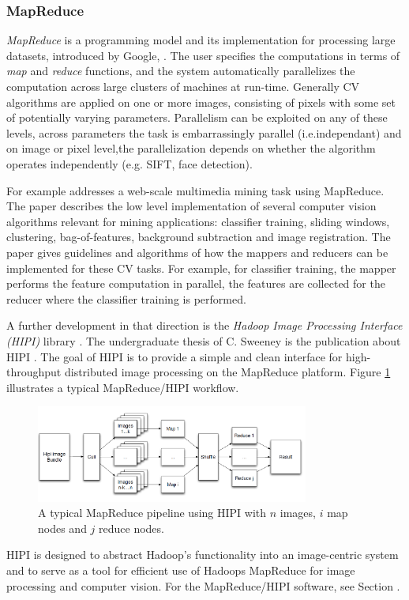 \subsubsection{MapReduce}

{\em MapReduce} is a programming model and its implementation for processing large datasets, introduced by Google, \cite{Dean:2008}. The user specifies the computations in terms of {\em map} and {\em reduce} functions, and the system automatically parallelizes the computation across large clusters of machines at run-time. Generally CV algorithms are applied on one or more images, consisting of pixels with some set of potentially varying parameters. Parallelism can be exploited on any of these levels, across parameters the task is embarrassingly parallel (i.e.independant) and on image or pixel level,the parallelization depends on whether the algorithm operates independently (e.g. SIFT, face detection).

For example \cite{White:2010} addresses a web-scale multimedia mining task using MapReduce. The paper describes the low level implementation of several computer vision algorithms relevant for mining applications: classifier training, sliding windows, clustering, bag-of-features, background subtraction and image registration. The paper gives guidelines and algorithms of how the mappers and reducers can be implemented for these CV tasks. For example, for classifier training, the mapper performs the feature computation in parallel, the features are collected for the reducer where the classifier training is performed. 

A further development in that direction is the {\em Hadoop Image Processing Interface (HIPI)} library \cite{hipi_soft}. The undergraduate thesis of C. Sweeney is the publication about HIPI \cite{hipi_pub}. The goal of HIPI is to provide a simple and clean interface for high-throughput distributed image processing on the MapReduce platform. Figure \ref{fig:hipi} illustrates a typical MapReduce/HIPI workflow.

\begin{figure}[H]
\begin{center}
\includegraphics[width=0.8\textwidth]{fig/HIPI}
\end{center}
\caption{A typical MapReduce pipeline using HIPI with $n$ images, $i$ map nodes and $j$ reduce nodes.}
\label{fig:hipi}
\end{figure}
HIPI is designed to abstract Hadoop's functionality into an image-centric system and to serve as a tool for efficient use of Hadoops MapReduce for image processing and computer vision.
For the MapReduce/HIPI software, see Section .

